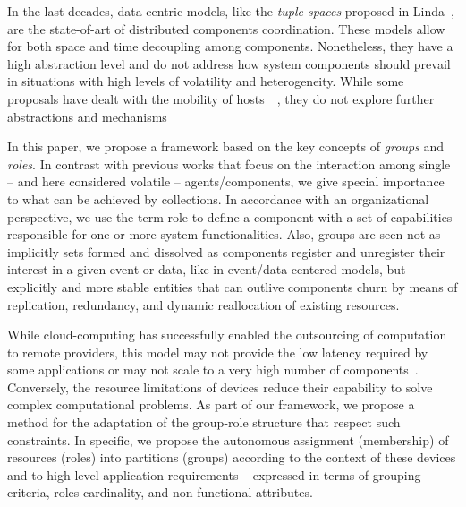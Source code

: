 In the last decades, data-centric models, like the \textit{tuple spaces} proposed in Linda~\cite{Gelernter:1985}, are the state-of-art of distributed components coordination. These models allow for both space and time decoupling among components. %
Nonetheless, they have a high abstraction level and do not address how system components should prevail in situations with high levels of volatility and heterogeneity. While some proposals have dealt with the mobility of hosts~\cite{Murphy:2001}\cite{Mamei:2003}~\cite{Murphy:2006:2}, they do not explore further abstractions and mechanisms 







In this paper, we propose a framework based on the key concepts of \textit{groups} and \textit{roles}. In contrast with previous works that focus on the interaction among single -- and here considered volatile -- agents/components, we give special importance to what can be achieved by collections. In accordance with an organizational perspective, we use the term role to define a component with a set of capabilities responsible for one or more system functionalities. Also, groups are seen not as implicitly sets formed and dissolved as components register and unregister their interest in a given event or data, like in event/data-centered models, 
but explicitly and more stable entities that can outlive components churn by means of replication, redundancy, and dynamic reallocation of existing resources.

While cloud-computing has successfully enabled the outsourcing of computation to remote providers, this model may not provide the low latency required by some applications or may not scale to a very high number of components~\cite{FOG}. Conversely, the resource limitations of devices reduce their capability to solve complex computational problems. As part of our framework, we propose a method for the adaptation of the group-role structure that respect such constraints. %
In specific, we propose the autonomous assignment (membership) of resources (roles) into partitions (groups) according to the context of these devices and to high-level application requirements -- expressed in terms of grouping criteria, roles cardinality, and non-functional attributes. 

